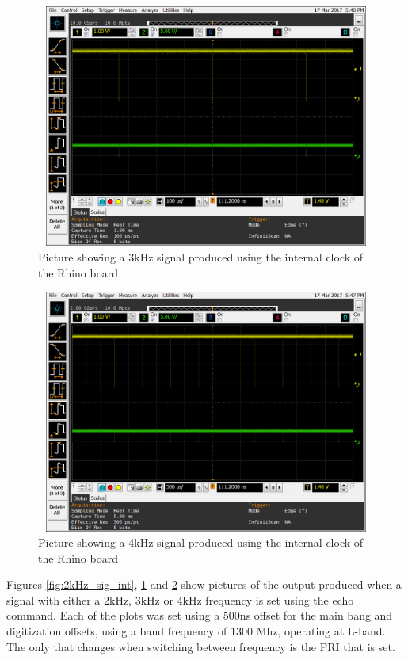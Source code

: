 \documentclass[12pt, a4paper]{article}
\begin{document}
	\begin{figure}[t]
		\centering
		\includegraphics[width=13cm, height=8cm]{3khz_mb_offset_500_ns}
		\caption{Picture showing a 3kHz signal produced using the internal clock of the Rhino board}
		\label{fig:3kHz_sig_int}
	\end{figure}
	
	\begin{figure}[t]
		\centering
		\includegraphics[width=13cm, height=8cm]{4khz_mb_offset_500_ns}
		\caption{Picture showing a 4kHz signal produced using the internal clock of the Rhino board}
		\label{fig:4kHz_sig_int}
	\end{figure}


Figures \ref{fig:2kHz_sig_int}, \ref{fig:3kHz_sig_int} and \ref{fig:4kHz_sig_int} show pictures of the output produced when a signal with either a 2kHz, 3kHz or 4kHz frequency is set using the echo command. Each of the plots was set using a 500ns offset for the main bang and digitization offsets, using a band frequency of 1300 Mhz, operating at L-band. The only that changes when switching between frequency is the PRI that is set. 
\end{document}
